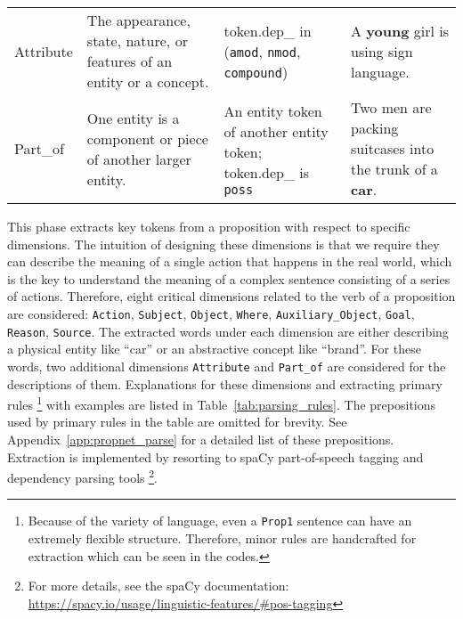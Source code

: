 \begin{table*}[h!]
{\begin{tabular}{p{}|p{}|p{}|p{}}
            Attribute	&The appearance, state, nature, or features of an entity or a concept.	&token.dep\_ in (\texttt{amod}, \texttt{nmod}, \texttt{compound}) 	&A \textbf{young} girl is using sign language.		\\														
            Part\_of	&One entity is a component or piece of another larger entity.	& An entity token of another entity token; token.dep\_ is \texttt{poss}	& Two men are packing suitcases into the trunk of a \textbf{car}.		\\															
			\bottomrule
		\end{tabular}
	}
    \caption{ Dimensions of parsing a \texttt{Prop1}/\texttt{Prop0} sentence. Dimensions \texttt{Attribute} and \texttt{Part\_of} are designed for an entity or concept. Others are related to the action in a proposition. Primary rules of extracting tokens are explained with examples. Note that token.pos\_ and token.dep\_ are the POS tagging and dependency parsing results from spaCy. The bold text in an example is the extracted token for its dimension. Dimensions marked with a ``*'' also follow this parsing rule \texttt{token.pos\_ in (\texttt{NOUN}, \texttt{PRON}, \texttt{PROPN}, \texttt{NUM})} which is omited in the table for brevity.
	} \label{tab:parsing_rules}	
\end{table*}


This phase extracts key tokens from a proposition with respect to specific dimensions. The intuition of designing these dimensions is that we require they can describe the meaning of a single action that happens in the real world, which is the key to understand the meaning of a complex sentence consisting of a series of actions. Therefore, eight critical dimensions related to the verb of a proposition are considered: \texttt{Action}, \texttt{Subject}, \texttt{Object}, \texttt{Where}, \texttt{Auxiliary\_Object}, \texttt{Goal}, \texttt{Reason}, \texttt{Source}. The extracted words under each dimension are either describing a physical entity like ``car'' or an abstractive concept like ``brand''. For these words, two additional dimensions \texttt{Attribute} and \texttt{Part\_of} are considered for the descriptions of them. Explanations for these dimensions and extracting primary rules \footnote{Because of the variety of language, even a \texttt{Prop1} sentence can have an extremely flexible structure. Therefore, minor rules are handcrafted for extraction which can be seen in the codes.} with examples are listed in Table~\ref{tab:parsing_rules}. The prepositions used by primary rules in the table are omitted for brevity. See Appendix~\ref{app:propnet_parse} for a detailed list of these prepositions. Extraction is implemented by resorting to spaCy part-of-speech tagging and dependency parsing tools \footnote{For more details, see the spaCy documentation: \url{https://spacy.io/usage/linguistic-features/\#pos-tagging}}.  

